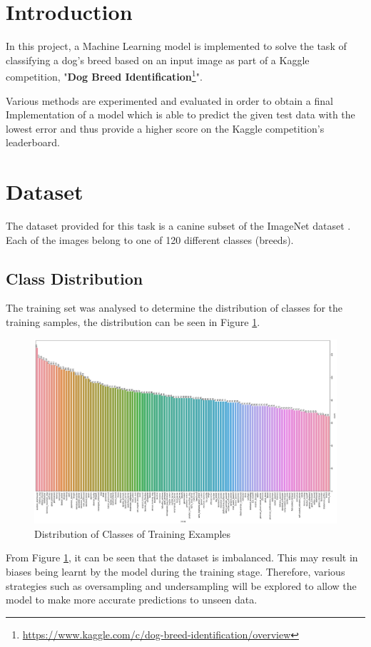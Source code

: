 \documentclass[sigconf,nonacm=true]{acmart}
\begin{document}
\maketitle

\section{Introduction}
In this project, a Machine Learning model is implemented to solve the 
task of classifying a dog's breed based on an input image as part of 
a Kaggle competition, "\textbf{Dog Breed Identification}\footnote[1]{\url{https://www.kaggle.com/c/dog-breed-identification/overview}}".

Various methods are experimented and evaluated in order to obtain a final 
Implementation of a model which is able to predict the given test data with the 
lowest error and thus provide a higher score on the Kaggle competition's leaderboard.
\section{Dataset}
The dataset provided for this task is a canine subset of the ImageNet dataset \cite{ILSVRC15}. Each of the images
belong to one of 120 different classes (breeds).

\subsection{Class Distribution}
\label{section:classdistro}
The training set was analysed to determine the distribution of classes for the training samples, the distribution 
can be seen in Figure \ref{fig:classdistro}.
\begin{figure}[H]
	\centering
	\includegraphics[width=0.9\linewidth]{fig/classdistribution.png}
	\caption{Distribution of Classes of Training Examples}
	\label{fig:classdistro}
\end{figure}
From Figure \ref{fig:classdistro}, it can be seen that the dataset is imbalanced. This may result in 
biases being learnt by the model during the training stage. Therefore, various strategies such as 
oversampling and undersampling will be explored to allow the model to make more accurate predictions
to unseen data.
\end{document}

